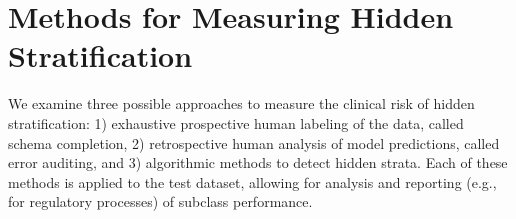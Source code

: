 \documentclass{article}
\begin{document}

\section{Methods for Measuring Hidden Stratification}
We examine three possible approaches to measure the clinical risk of hidden stratification: 1) exhaustive prospective human labeling of the data, called schema completion, 2) retrospective human analysis of model predictions, called error auditing, and 3) algorithmic methods to detect hidden strata.  
Each of these methods is applied to the test dataset, allowing for analysis and reporting (e.g., for regulatory processes) of subclass performance.
\end{document}
